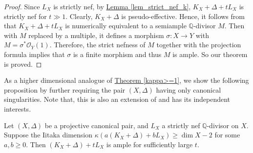 \begin{proof}
Since $L_X$ is strictly nef, by 	{\hyperref[lem_strict_nef_k]{Lemma \ref*{lem_strict_nef_k}}}, $K_X+\Delta+tL_X$ is strictly nef for $t\gg 1$.
Clearly, $K_X+\Delta$ is pseudo-effective.
Hence, it follows from \cite[Corollary D]{LP20A} that $K_X+\Delta+tL_X$ is numerically equivalent to a semiample $\mathbb{Q}$-divisor $M$.
Then with $M$ replaced by a multiple, it defines a morphism $\sigma:X\to Y$ with $M=\sigma^*\mathcal{O}_Y(1)$.
Therefore, the strict nefness of $M$ together with the projection formula implies that $\sigma$ is a finite morphism and thus $M$ is  ample.
So our theorem is proved.
\end{proof}






As a higher dimensional analogue of {\hyperref[kappa>=1]{Theorem  \ref*{kappa>=1}}},
we show the following proposition by further requiring  the pair $(X,\Delta)$ having only canonical singularities.
Note that, this is also an extension of \cite[Theorem 2.6]{CCP08} and has its independent interests.
\begin{prop}[{cf.~{\hyperref[kappa>=1]{Theorem  \ref*{kappa>=1}}} and \cite[Theorem 2.6]{CCP08}}]\label{thm_higher-dim-kappa>=1}
Let $(X,\Delta)$ be a projective canonical pair, and $L_X$ a strictly nef $\mathbb{Q}$-divisor on $X$.
Suppose  the Iitaka dimension $\kappa(a(K_X+\Delta)+bL_X)\geqslant\dim X-2$ for some $a,b\geqslant 0$.
Then $(K_X+\Delta)+tL_X$ is ample for sufficiently large $t$.
\end{prop}

